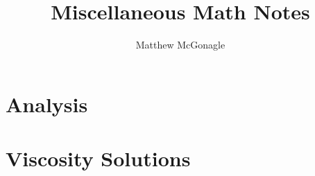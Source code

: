 \documentclass[14pt]{article}
\theoremstyle{definition}
\begin{document}
\title{Miscellaneous Math Notes}
\author{Matthew McGonagle}
\maketitle

%

\tableofcontents

\section{Analysis}



\section{Viscosity Solutions}





\end{document}
